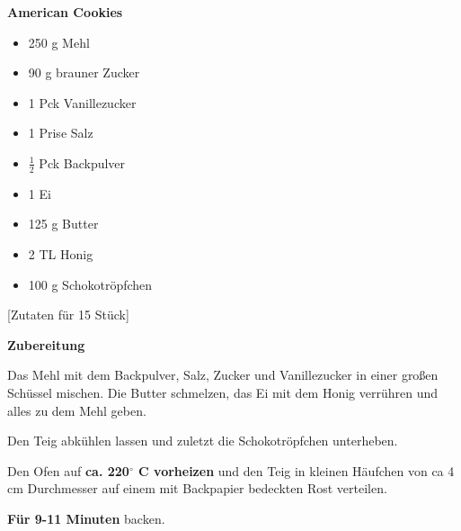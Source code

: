 

\parindent0pt	

\pagestyle{empty}


\textbf{{\LARGE American Cookies}}%

\hrulefill
\vspace*{\fill}
\begin{multicols}{2}	


\begin{itemize}
\item 250 g Mehl
\item 90 g brauner Zucker
\item 1 Pck Vanillezucker
\item 1 Prise Salz
\item $\frac{1}{2}$ Pck Backpulver
\item 1 Ei
\item 125 g Butter
\item 2 TL Honig
\item 100 g Schokotröpfchen
\end{itemize}
\end{multicols}
\vfill									%

\vspace{1.5cm}
%
\begin{center}
%
[Zutaten für 15 Stück]%
\end{center}


\vfill
\newpage
\textbf{{\LARGE Zubereitung}}%

\hrulefill

\vspace*{\fill}
\begin{multicols}{2}

Das Mehl mit dem Backpulver, Salz,  Zucker und Vanillezucker in einer großen Schüssel mischen.\newline
Die Butter schmelzen, das Ei mit dem Honig verrühren und alles zu dem Mehl geben.\newline

Den Teig abkühlen lassen und zuletzt die Schokotröpfchen unterheben.\newline

Den Ofen auf  \textbf{ca. 220$^\circ$ C vorheizen} und den Teig in kleinen 
Häufchen von ca 4 cm Durchmesser auf einem mit Backpapier bedeckten Rost verteilen.\newline

\textbf{Für 9-11 Minuten} backen.


\end{multicols}
\vfill
